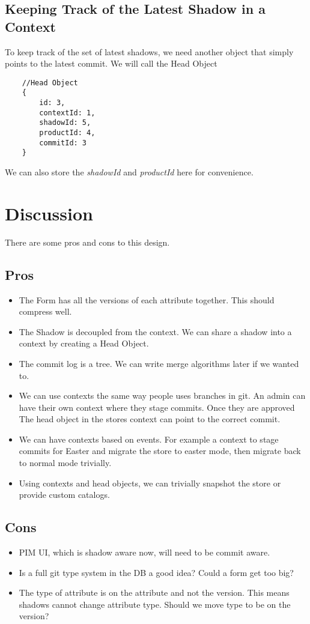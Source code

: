 \documentclass[11pt]{article}
\begin{document}
\subsection{Keeping Track of the Latest Shadow in a Context}

To keep track of the set of latest shadows, we need another object that simply
points to the latest commit. We will call the Head Object

\begin{lstlisting}
    //Head Object
    {
        id: 3,
        contextId: 1,
        shadowId: 5,
        productId: 4,
        commitId: 3
    }
\end{lstlisting}

We can also store the \emph{shadowId} and \emph{productId} here for convenience.

\section{Discussion}

There are some pros and cons to this design. 

\subsection{Pros}

\begin{itemize}
    \item The Form has all the versions of each attribute together. This should
        compress well.
    \item The Shadow is decoupled from the context. We can share a shadow into
        a context by creating a Head Object.
    \item The commit log is a tree. We can write merge algorithms later if we wanted
        to.
    \item We can use contexts the same way people uses branches in git. An admin
        can have their own context where they stage commits. Once they are approved
        The head object in the stores context can point to the correct commit.
    \item We can have contexts based on events. For example a context to stage
        commits for Easter and migrate the store to easter mode, then migrate
        back to normal mode trivially.
    \item Using contexts and head objects, we can trivially snapshot the store
        or provide custom catalogs. 
\end{itemize}

\subsection{Cons}
\begin{itemize}
    \item PIM UI, which is shadow aware now, will need to be commit aware.
    \item Is a full git type system in the DB a good idea? Could a form get too big?
    \item The type of attribute is on the attribute and not the version. This means
        shadows cannot change attribute type. Should we move type to be on the version?
\end{itemize}
\end{document}
